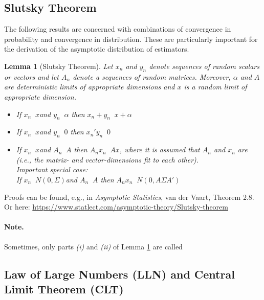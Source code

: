 \documentclass[
  14pt,
]{memoir}
\DeclareMathOperator{\toprob}{\overset{p}{\longrightarrow}}
\DeclareMathOperator{\todistr}{\overset{d}{\longrightarrow}}
\newtheorem{lemma}[theorem]{Lemma}
\begin{document}
\hypertarget{slutsky-theorem}{%
\subsection{Slutsky Theorem}\label{slutsky-theorem}}

The following results are concerned with combinations of convergence in probability and convergence in distribution. These are particularly important for the derivation of the asymptotic distribution of estimators.\\

\begin{lemma}[Slutsky Theorem]\label{Slutsky} Let $x_n$ and $y_n$ denote sequences of random scalars or vectors and let $A_n$ denote a sequences of random matrices. Moreover, $\alpha$ and $A$ are deterministic limits of appropriate dimensions and $x$ is a random limit of appropriate dimension. 
\begin{itemize}
  \item[(i)] If $x_n\todistr x$\quad and \quad $y_n\toprob \alpha$ \quad then\;\; $x_n+y_n\todistr x+\alpha$
  \item[(ii)] If $x_n\todistr x$\quad and \quad $y_n\toprob 0$ \quad then\;\; $x_n'y_n\toprob 0$
  \item[(iii)] If $x_n\todistr x$\quad and \quad $A_n\toprob A$ \quad then\;\; $A_nx_n\todistr Ax$, where it is assumed that $A_n$ and $x_n$ are  (i.e., the matrix- and vector-dimensions fit to each other). \\[2ex]
Important special case:\\
If $x_n\todistr N(0,\Sigma)$\quad and \quad $A_n\toprob A$ \quad then\;\; $A_nx_n\todistr N(0,A\Sigma A')$
\end{itemize}  
\end{lemma}

\noindent Proofs can be found, e.g., in \emph{Asymptotic Statistics}, van der Vaart, Theorem 2.8. Or here: \url{https://www.statlect.com/asymptotic-theory/Slutsky-theorem}

\paragraph*{Note.}

Sometimes, only parts \textit{(i)} and \textit{(ii)} of Lemma \ref{Slutsky} are called 

\hypertarget{law-of-large-numbers-lln-and-central-limit-theorem-clt}{%
\subsection{Law of Large Numbers (LLN) and Central Limit Theorem (CLT)}\label{law-of-large-numbers-lln-and-central-limit-theorem-clt}}
\end{document}
